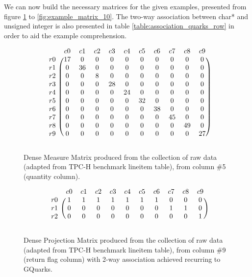 We can now build the necessary matrices for the given examples, presented from figure  \ref{fig:example_matrix_5} to \ref{fig:example_matrix_10}. The two-way association between char* and unsigned integer is also presented in table \ref{table:association_quarks_row} in order to aid the example comprehension. 


  \begin{figure}[H]
    \centering
    \caption{Dense Measure Matrix produced from the collection of raw data (adapted from TPC-H benchmark lineitem table), from column \#5 (quantity column).}
\[
\begin{blockarray}{ccccccccccc}
	&	c0	&	c1	&	c2	&	c3	&	c4	&	c5	&	c6	&	c7	&	c8	&	c9	\\
\begin{block}{c(cccccccccc)}
r0	&	17	&	0	&	0	&	0	&	0	&	0	&	0	&	0	&	0	&	0	\\
r1	&	0	&	36	&	0	&	0	&	0	&	0	&	0	&	0	&	0	&	0	\\
r2	&	0	&	0	&	8	&	0	&	0	&	0	&	0	&	0	&	0	&	0	\\
r3	&	0	&	0	&	0	&	28	&	0	&	0	&	0	&	0	&	0	&	0	\\
r4	&	0	&	0	&	0	&	0	&	24	&	0	&	0	&	0	&	0	&	0	\\
r5	&	0	&	0	&	0	&	0	&	0	&	32	&	0	&	0	&	0	&	0	\\
r6	&	0	&	0	&	0	&	0	&	0	&	0	&	38	&	0	&	0	&	0	\\
r7	&	0	&	0	&	0	&	0	&	0	&	0	&	0	&	45	&	0	&	0	\\
r8	&	0	&	0	&	0	&	0	&	0	&	0	&	0	&	0	&	49	&	0	\\
r9	&	0	&	0	&	0	&	0	&	0	&	0	&	0	&	0	&	0	&	27	\\
\end{block}
\end{blockarray}
 \]
    \label{fig:example_matrix_5}
    \end{figure}
        
\begin{figure}[H]
\centering
\caption{Dense Projection Matrix produced from the collection of raw data (adapted from TPC-H benchmark lineitem table), from column \#9 (return flag column) with 2-way association achieved recurring to GQuarks.}
\[
\begin{blockarray}{ccccccccccc}
	&	c0	&	c1	&	c2	&	c3	&	c4	&	c5	&	c6	&	c7	&	c8	&	c9	\\
\begin{block}{c(cccccccccc)}
r0	&	1	&	1	&	1	&	1	&	1	&	1	&	1	&	0	&	0	&	0	\\
r1	&	0	&	0	&	0	&	0	&	0	&	0	&	0	&	1	&	1	&	0	\\
r2	&	0	&	0	&	0	&	0	&	0	&	0	&	0	&	0	&	0	&	1	\\
\end{block}
\end{blockarray}
\]
    \label{fig:example_matrix_9}
\end{figure}

